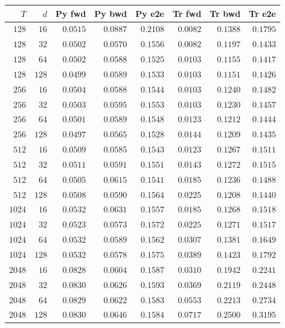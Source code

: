 \begin{tabular}{rrrrrrrr}
\toprule
$T$ & $d$ & Py fwd & Py bwd & Py e2e & Tr fwd & Tr bwd & Tr e2e \\
\midrule
${128}$ & ${16}$ & $0.0515$ & $0.0887$ & $0.2108$ & $0.0082$ & $0.1388$ & $0.1795$ \\
${128}$ & ${32}$ & $0.0502$ & $0.0570$ & $0.1556$ & $0.0082$ & $0.1197$ & $0.1433$ \\
${128}$ & ${64}$ & $0.0502$ & $0.0588$ & $0.1525$ & $0.0103$ & $0.1155$ & $0.1417$ \\
${128}$ & ${128}$ & $0.0499$ & $0.0589$ & $0.1533$ & $0.0103$ & $0.1151$ & $0.1426$ \\
${256}$ & ${16}$ & $0.0504$ & $0.0588$ & $0.1544$ & $0.0103$ & $0.1240$ & $0.1482$ \\
${256}$ & ${32}$ & $0.0503$ & $0.0595$ & $0.1553$ & $0.0103$ & $0.1230$ & $0.1457$ \\
${256}$ & ${64}$ & $0.0501$ & $0.0589$ & $0.1548$ & $0.0123$ & $0.1212$ & $0.1444$ \\
${256}$ & ${128}$ & $0.0497$ & $0.0565$ & $0.1528$ & $0.0144$ & $0.1209$ & $0.1435$ \\
${512}$ & ${16}$ & $0.0509$ & $0.0585$ & $0.1543$ & $0.0123$ & $0.1267$ & $0.1511$ \\
${512}$ & ${32}$ & $0.0511$ & $0.0591$ & $0.1551$ & $0.0143$ & $0.1272$ & $0.1515$ \\
${512}$ & ${64}$ & $0.0505$ & $0.0615$ & $0.1541$ & $0.0185$ & $0.1236$ & $0.1488$ \\
${512}$ & ${128}$ & $0.0508$ & $0.0590$ & $0.1564$ & $0.0225$ & $0.1208$ & $0.1440$ \\
${1024}$ & ${16}$ & $0.0532$ & $0.0631$ & $0.1557$ & $0.0185$ & $0.1268$ & $0.1518$ \\
${1024}$ & ${32}$ & $0.0523$ & $0.0573$ & $0.1572$ & $0.0225$ & $0.1271$ & $0.1517$ \\
${1024}$ & ${64}$ & $0.0532$ & $0.0589$ & $0.1562$ & $0.0307$ & $0.1381$ & $0.1649$ \\
${1024}$ & ${128}$ & $0.0532$ & $0.0578$ & $0.1575$ & $0.0389$ & $0.1423$ & $0.1792$ \\
${2048}$ & ${16}$ & $0.0828$ & $0.0604$ & $0.1587$ & $0.0310$ & $0.1942$ & $0.2241$ \\
${2048}$ & ${32}$ & $0.0830$ & $0.0626$ & $0.1593$ & $0.0369$ & $0.2119$ & $0.2448$ \\
${2048}$ & ${64}$ & $0.0829$ & $0.0622$ & $0.1583$ & $0.0553$ & $0.2213$ & $0.2734$ \\
${2048}$ & ${128}$ & $0.0830$ & $0.0646$ & $0.1584$ & $0.0717$ & $0.2500$ & $0.3195$ \\

\end{tabular}
